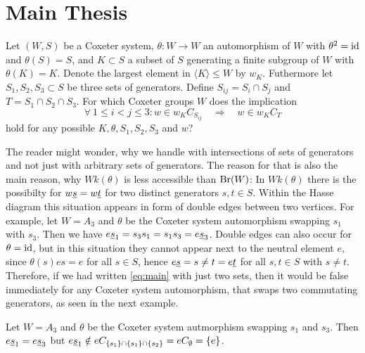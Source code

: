 \section{Main Thesis}
\label{sec:main-thesis}

\begin{ques}
	Let $(W,S)$ be a Coxeter system, $\theta : W \to W$ an automorphism of $W$ with $\theta^2 = \operatorname{id}$ and $\theta(S) = S$, and $K \subset S$ a subset of $S$ generating a finite subgroup of $W$ with $\theta(K) = K$. Denote the largest element in $\langle K \rangle \leq W$ by $w_K$. Futhermore let $S_1,S_2,S_3 \subset S$ be three sets of generators. Define $S_{ij} = S_i \cap S_j$ and $T = S_1 \cap S_2 \cap S_3$. For which Coxeter groups $W$ does the implication
	\begin{equation}
		\label{eq:main}
		\forall \ 1 \leq i < j \leq 3 : w \in w_K C_{S_{ij}} \quad \Rightarrow \quad w \in w_K C_T
	\end{equation}
	hold for any possible $K,\theta,S_1,S_2,S_3$ and $w$?
\end{ques}

The reader might wonder, why we handle with intersections of sets of generators and not just with arbitrary sets of generators. The reason for that is also the main reason, why $Wk(\theta)$ is less accessible than $\operatorname{Br}(W)$: In $Wk(\theta)$ there is the possibilty for $w \underline{s} = w \underline{t}$ for two distinct generators $s,t \in S$. Within the Hasse diagram this situation appears in form of double edges between two vertices. For example, let $W = A_3$ and $\theta$ be the Coxeter system automorphism swapping $s_1$ with $s_3$. Then we have $e \underline{s}_1 = s_3 s_1 = s_1 s_3 = e \underline{s}_3$. Double edges can also occur for $\theta = \operatorname{id}$, but in this situation they cannot appear next to the neutral element $e$, since $\theta(s)es = e$ for all $s \in S$, hence $e \underline{s} = s \neq t = e \underline{t}$ for all $s,t \in S$ with $s \neq t$. Therefore, if we had written \ref{eq:main} with just two sets, then it would be false immediately for any Coxeter system automorphism, that swaps two commutating generators, as seen in the next example.

\begin{exam}
	Let $W = A_3$ and $\theta$ be the Coxeter system autmorphism swapping $s_1$ and $s_3$. Then $e \underline{s}_1 = e \underline{s}_3$ but $e \underline{s}_1 \notin eC_{\{s_1\} \cap \{s_1\} \cap \{s_2\}} = eC_\emptyset = \{e\}$.
\end{exam}

